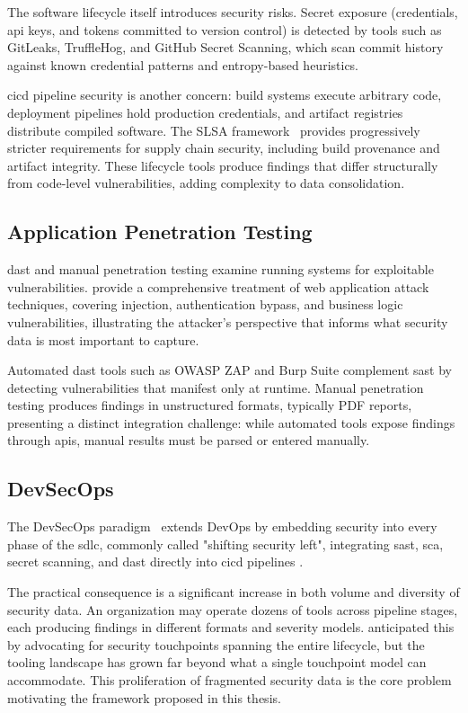 The software lifecycle itself introduces security risks. Secret exposure (credentials, \gls{api} keys, and tokens committed to version control) is detected by tools such as GitLeaks, TruffleHog, and GitHub Secret Scanning, which scan commit history against known credential patterns and entropy-based heuristics.

\gls{cicd} pipeline security is another concern: build systems execute arbitrary code, deployment pipelines hold production credentials, and artifact registries distribute compiled software. The SLSA framework~\parencite{SLSA2024} provides progressively stricter requirements for supply chain security, including build provenance and artifact integrity. These lifecycle tools produce findings that differ structurally from code-level vulnerabilities, adding complexity to data consolidation.

\subsection{Application Penetration Testing}
\label{sec:penetration-testing}

\Gls{dast} and manual penetration testing examine running systems for exploitable vulnerabilities. \textcite{Stuttard2011} provide a comprehensive treatment of web application attack techniques, covering injection, authentication bypass, and business logic vulnerabilities, illustrating the attacker's perspective that informs what security data is most important to capture.

Automated \gls{dast} tools such as OWASP ZAP and Burp Suite complement \gls{sast} by detecting vulnerabilities that manifest only at runtime. Manual penetration testing produces findings in unstructured formats, typically PDF reports, presenting a distinct integration challenge: while automated tools expose findings through \glspl{api}, manual results must be parsed or entered manually.

\subsection{DevSecOps}
\label{sec:devsecops}

The DevSecOps paradigm~\parencite{Mack2023} extends DevOps by embedding security into every phase of the \gls{sdlc}, commonly called "shifting security left", integrating \gls{sast}, \gls{sca}, secret scanning, and \gls{dast} directly into \gls{cicd} pipelines \parencite{Kim2021}.

The practical consequence is a significant increase in both volume and diversity of security data. An organization may operate dozens of tools across pipeline stages, each producing findings in different formats and severity models. \textcite{McGraw2006} anticipated this by advocating for security touchpoints spanning the entire lifecycle, but the tooling landscape has grown far beyond what a single touchpoint model can accommodate. This proliferation of fragmented security data is the core problem motivating the framework proposed in this thesis.

